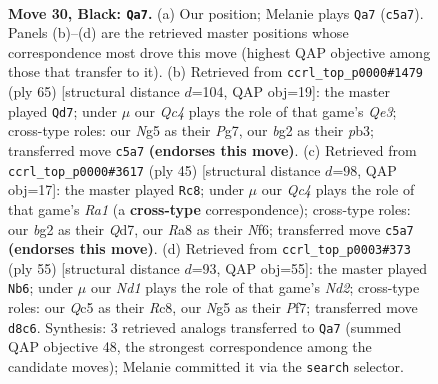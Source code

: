 \documentclass[11pt]{article}
\begin{document}
\clearpage

\begin{figure}[p]\centering
\begin{subfigure}{0.46\textwidth}\centering
\resizebox{\linewidth}{!}{%
\newchessgame
\chessboard[
  setfen={r2n1k2/1p1Q1pp1/p7/2q3np/7N/4P1P1/PP2RPBP/1R4K1 b - - 0 30},
  showmover=false,
  pgfstyle=straightmove, color=movearrow, markmove={c5-a7}
]}
\caption{}
\end{subfigure}\hfill
\begin{subfigure}{0.46\textwidth}\centering
\resizebox{\linewidth}{!}{%
\newchessgame
\chessboard[
  setfen={4r1k1/1p3pp1/1pp1q3/4n2Q/P3N2p/1P2R2P/5PP1/6K1 b - - 1 33},
  showmover=false,
  pgfstyle=straightmove, color=movearrow, markmove={e6-d7}
]}
\caption{}
\end{subfigure}
\\[4pt]
\begin{subfigure}{0.46\textwidth}\centering
\resizebox{\linewidth}{!}{%
\newchessgame
\chessboard[
  setfen={r5k1/p2q1ppp/1p3n2/2pPr3/2Q5/PP4P1/5PBP/R2R2K1 b - - 0 23},
  showmover=false,
  pgfstyle=straightmove, color=movearrow, markmove={a8-c8}
]}
\caption{}
\end{subfigure}\hfill
\begin{subfigure}{0.46\textwidth}\centering
\resizebox{\linewidth}{!}{%
\newchessgame
\chessboard[
  setfen={2r3k1/p2n1pp1/2bQp2p/q1p5/4P2P/2N3P1/PP1R1P2/5BK1 b - - 0 28},
  showmover=false,
  pgfstyle=straightmove, color=movearrow, markmove={d7-b6}
]}
\caption{}
\end{subfigure}
\caption{\textbf{Move 30, Black: \texttt{Qa7}.} (a) Our position; Melanie plays \texttt{Qa7} (\texttt{c5a7}). Panels (b)--(d) are the retrieved master positions whose correspondence most drove this move (highest QAP objective among those that transfer to it). (b) Retrieved from \texttt{ccrl\_top\_p0000\#1479} (ply 65) [structural distance $d$=104, QAP obj=19]: the master played \texttt{Qd7}; under $\mu$ our \emph{Qc4} plays the role of that game's \emph{Qe3}; cross-type roles: our \emph{N}g5 as their \emph{P}g7, our \emph{b}g2 as their \emph{p}b3; transferred move \texttt{c5a7} \textbf{(endorses this move)}. (c) Retrieved from \texttt{ccrl\_top\_p0000\#3617} (ply 45) [structural distance $d$=98, QAP obj=17]: the master played \texttt{Rc8}; under $\mu$ our \emph{Qc4} plays the role of that game's \emph{Ra1} (a \textbf{cross-type} correspondence); cross-type roles: our \emph{b}g2 as their \emph{Q}d7, our \emph{R}a8 as their \emph{N}f6; transferred move \texttt{c5a7} \textbf{(endorses this move)}. (d) Retrieved from \texttt{ccrl\_top\_p0003\#373} (ply 55) [structural distance $d$=93, QAP obj=55]: the master played \texttt{Nb6}; under $\mu$ our \emph{Nd1} plays the role of that game's \emph{Nd2}; cross-type roles: our \emph{Q}c5 as their \emph{R}c8, our \emph{N}g5 as their \emph{P}f7; transferred move \texttt{d8c6}. Synthesis: 3 retrieved analogs transferred to \texttt{Qa7} (summed QAP objective 48, the strongest correspondence among the candidate moves); Melanie committed it via the \texttt{search} selector.}
\label{fig:thought-m59}
\end{figure}
\end{document}
